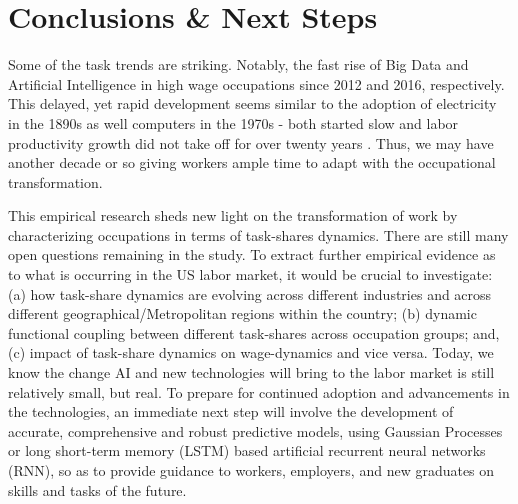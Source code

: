 \documentclass[letterpaper]{article} %
\begin{document}
\section{Conclusions \& Next Steps}
Some of the task trends are striking. Notably, the fast rise of Big Data and Artificial Intelligence in high wage occupations since 2012 and 2016, respectively. This delayed, yet rapid development seems similar to the adoption of electricity in the 1890s as well computers in the 1970s - both started slow and labor productivity growth did not take off for over twenty years \cite{BrynjolfssonMcAfee2014}. Thus, we may have another decade or so giving workers ample time to adapt with the occupational transformation.


\par
This empirical research sheds new light on the transformation of work by characterizing occupations in terms of task-shares dynamics. There are still many open questions remaining in the study. To extract further empirical evidence as to what is occurring in the US labor market, it would be crucial to investigate: (a) how task-share dynamics are evolving across different industries and across different geographical/Metropolitan regions within the country; (b) dynamic functional coupling between different task-shares across occupation groups; and, (c) impact of task-share dynamics on wage-dynamics and vice versa. Today, we know the change AI and new technologies will bring to the labor market is still relatively small, but real. To prepare for continued adoption and advancements in the technologies, an immediate next step will involve the development of accurate, comprehensive and robust predictive models, using Gaussian Processes or long short-term memory (LSTM) based artificial recurrent neural networks (RNN), so as to provide guidance to workers, employers, and new graduates on skills and tasks of the future.






\clearpage
\end{document}
